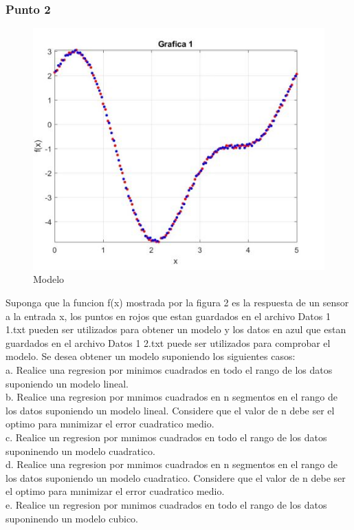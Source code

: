 \documentclass[12pt,letterpaper]{article}
\begin{document}
 \subsubsection{Punto 2}
 \begin{figure}[hbtp]
 \centering
 \includegraphics[scale=.7]{imagenes/modelo2.JPG}
 \caption{Modelo}
 \end{figure}
 
Suponga que la funcion f(x) mostrada por la figura 2 es la respuesta de un
sensor a la entrada x, los puntos en rojos que estan guardados en el archivo Datos 1 1.txt pueden ser utilizados para obtener un modelo y los datos en azul que
estan guardados en el archivo Datos 1 2.txt puede ser utilizados para comprobar
el modelo. Se desea obtener un modelo suponiendo los siguientes casos:\\
a. Realice una regresion por minimos cuadrados en todo el rango de los datos
suponiendo un modelo lineal.\\
b. Realice una regresion por mınimos cuadrados en n segmentos en el rango
de los datos suponiendo un modelo lineal. Considere que el valor de n debe
ser el optimo para mınimizar el error cuadratico medio.\\
c. Realice un regresion por mınimos cuadrados en todo el rango de los datos
suponinendo un modelo cuadratico.\\
d. Realice una regresion por mınimos cuadrados en n segmentos en el rango
de los datos suponiendo un modelo cuadratico. Considere que el valor de
n debe ser el optimo para mınimizar el error cuadratico medio.\\
e. Realice un regresion por mınimos cuadrados en todo el rango de los datos
suponinendo un modelo cubico.\\
\end{document}
